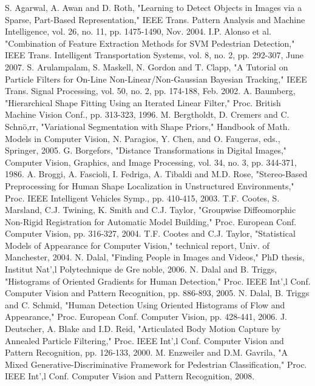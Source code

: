 \documentclass[10pt,letterpaper,journal,compsoc]{IEEEtran}
\begin{document}
\begin{thebibliography}{99}
S. Agarwal, A. Awan and D. Roth, "Learning to Detect Objects in Images via a Sparse, Part-Based Representation," IEEE Trans. Pattern Analysis and Machine Intelligence, vol. 26, no. 11, pp. 1475-1490, Nov. 2004. 
I.P. Alonso et al. "Combination of Feature Extraction Methods for SVM Pedestrian Detection," IEEE Trans. Intelligent Transportation Systems, vol. 8, no. 2, pp. 292-307, June 2007. 
S. Arulampalam, S. Maskell, N. Gordon and T. Clapp, "A Tutorial on Particle Filters for On-Line Non-Linear/Non-Gaussian Bayesian Tracking," IEEE Trans. Signal Processing, vol. 50, no. 2, pp. 174-188, Feb. 2002.
A. Baumberg, "Hierarchical Shape Fitting Using an Iterated Linear Filter," Proc. British Machine Vision Conf., pp. 313-323, 1996. 
M. Bergtholdt, D. Cremers and C. Schnö,rr, "Variational Segmentation with Shape Priors," Handbook of Math. Models in Computer Vision, N. Paragios, Y. Chen, and O. Faugeras, eds., Springer, 2005. 
G. Borgefors, "Distance Transformations in Digital Images," Computer Vision, Graphics, and Image Processing, vol. 34, no. 3, pp. 344-371, 1986.
A. Broggi, A. Fascioli, I. Fedriga, A. Tibaldi and M.D. Rose, "Stereo-Based Preprocessing for Human Shape Localization in Unstructured Environments," Proc. IEEE Intelligent Vehicles Symp., pp. 410-415, 2003. 
T.F. Cootes, S. Marsland, C.J. Twining, K. Smith and C.J. Taylor, "Groupwise Diffeomorphic Non-Rigid Registration for Automatic Model Building," Proc. European Conf. Computer Vision, pp. 316-327, 2004. 
T.F. Cootes and C.J. Taylor, "Statistical Models of Appearance for Computer Vision," technical report, Univ. of Manchester, 2004. 
N. Dalal, "Finding People in Images and Videos," PhD thesis, Institut Nat',l Polytechnique de Gre noble, 2006. 
N. Dalal and B. Triggs, "Histograms of Oriented Gradients for Human Detection," Proc. IEEE Int',l Conf. Computer Vision and Pattern Recognition, pp. 886-893, 2005. 
N. Dalal, B. Triggs and C. Schmid, "Human Detection Using Oriented Histograms of Flow and Appearance," Proc. European Conf. Computer Vision, pp. 428-441, 2006. 
J. Deutscher, A. Blake and I.D. Reid, "Articulated Body Motion Capture by Annealed Particle Filtering," Proc. IEEE Int',l Conf. Computer Vision and Pattern Recognition, pp. 126-133, 2000. 
M. Enzweiler and D.M. Gavrila, "A Mixed Generative-Discriminative Framework for Pedestrian Classification," Proc. IEEE Int',l Conf. Computer Vision and Pattern Recognition, 2008. 

\end{thebibliography}
\end{document}
